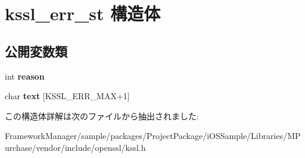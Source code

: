 \hypertarget{structkssl__err__st}{}\section{kssl\+\_\+err\+\_\+st 構造体}
\label{structkssl__err__st}
\subsection*{公開変数類}
\begin{DoxyCompactItemize}
\item 
\hypertarget{structkssl__err__st_a23922add87a55b59b3bd56d4b6fc4384}{}int {\bfseries reason}\label{structkssl__err__st_a23922add87a55b59b3bd56d4b6fc4384}

\item 
\hypertarget{structkssl__err__st_a2432fe3f3f02f5319bf7da930cc356bc}{}char {\bfseries text} \mbox{[}K\+S\+S\+L\+\_\+\+E\+R\+R\+\_\+\+M\+A\+X+1\mbox{]}\label{structkssl__err__st_a2432fe3f3f02f5319bf7da930cc356bc}

\end{DoxyCompactItemize}


この構造体詳解は次のファイルから抽出されました\+:\begin{DoxyCompactItemize}
\item 
Framework\+Manager/sample/packages/\+Project\+Package/i\+O\+S\+Sample/\+Libraries/\+M\+Purchase/vendor/include/openssl/kssl.\+h\end{DoxyCompactItemize}

